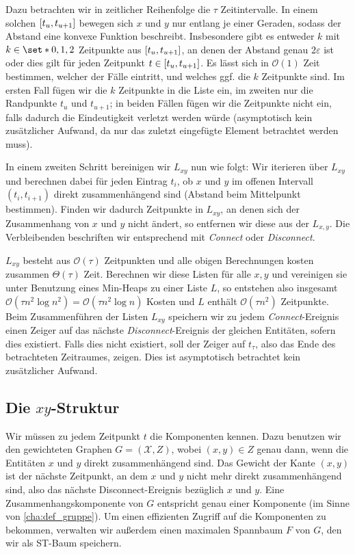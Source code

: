 Dazu betrachten wir in zeitlicher Reihenfolge die $\tau$ Zeitintervalle.
In einem solchen $\benbrace*{t_u,t_{u+1}}$ bewegen sich $x$ und $y$ nur entlang je einer Geraden, sodass der Abstand eine konvexe Funktion beschreibt.
Insbesondere gibt es entweder $k$ mit $k \in \set*{0,1,2}$ Zeitpunkte aus $\benbrace*{t_u,t_{u+1}}$, an denen der Abstand genau $2 \varepsilon$ ist oder dies gilt für jeden Zeitpunkt $t \in \benbrace*{t_u,t_{u+1}}$.
Es lässt sich in $\mathcal{O}(1)$ Zeit bestimmen, welcher der Fälle eintritt, und welches ggf. die $k$ Zeitpunkte sind.
Im ersten Fall fügen wir die $k$ Zeitpunkte in die Liste ein, im zweiten nur die Randpunkte $t_u$ und $t_{u+1}$; in beiden Fällen fügen wir die Zeitpunkte nicht ein, falls dadurch die Eindeutigkeit verletzt werden würde (asymptotisch kein zusätzlicher Aufwand, da nur das zuletzt eingefügte Element betrachtet werden muss).

In einem zweiten Schritt bereinigen wir $L_{xy}$ nun wie folgt: Wir iterieren über $L_{xy}$ und berechnen dabei für jeden Eintrag $t_i$, ob $x$ und $y$ im offenen Intervall $(t_i,t_{i+1})$ direkt zusammenhängend sind (Abstand beim Mittelpunkt bestimmen).
Finden wir dadurch Zeitpunkte in $L_{xy}$, an denen sich der Zusammenhang von $x$ und $y$ nicht ändert, so entfernen wir diese aus der $L_{x,y}$.
Die Verbleibenden beschriften wir entsprechend mit \emph{Connect} oder \emph{Disconnect}.

$L_{xy}$ besteht aus $\mathcal{O}(\tau)$ Zeitpunkten und alle obigen Berechnungen kosten zusammen $\Theta(\tau)$ Zeit.
Berechnen wir diese Listen für alle $x,y$ und vereinigen sie unter Benutzung eines Min-Heaps zu einer Liste $L$, so entstehen also insgesamt $\mathcal{O}(\tau n^2 \log n^2) = \mathcal{O}(\tau n^2 \log n)$ Kosten und $L$ enthält $\mathcal{O}(\tau n^2)$ Zeitpunkte.
Beim Zusammenführen der Listen $L_{xy}$ speichern wir zu jedem \emph{Connect}-Ereignis einen Zeiger auf das nächste \emph{Disconnect}-Ereignis der gleichen Entitäten, sofern dies existiert.
Falls dies nicht existiert, soll der Zeiger auf $t_\tau$, also das Ende des betrachteten Zeitraumes, zeigen.
Dies ist asymptotisch betrachtet kein zusätzlicher Aufwand.

\subsection{Die $xy$-Struktur} %
\label{sub:xy_struktur}
Wir müssen zu jedem Zeitpunkt $t$ die Komponenten kennen.
Dazu benutzen wir den gewichteten Graphen $G=(\mathcal{X},Z)$, wobei $(x,y) \in Z$ genau dann, wenn die Entitäten $x$ und $y$ direkt zusammenhängend sind.
Das Gewicht der Kante $(x,y)$ ist der nächste Zeitpunkt, an dem $x$ und $y$ nicht mehr direkt zusammenhängend sind, also das nächste Disconnect-Ereignis bezüglich $x$ und $y$.
Eine Zusammenhangskomponente von $G$ entspricht genau einer Komponente (im Sinne von \cref{cha:def_gruppe}).
Um einen effizienten Zugriff auf die Komponenten zu bekommen, verwalten wir außerdem einen maximalen Spannbaum $F$ von $G$, den wir als ST-Baum speichern.


